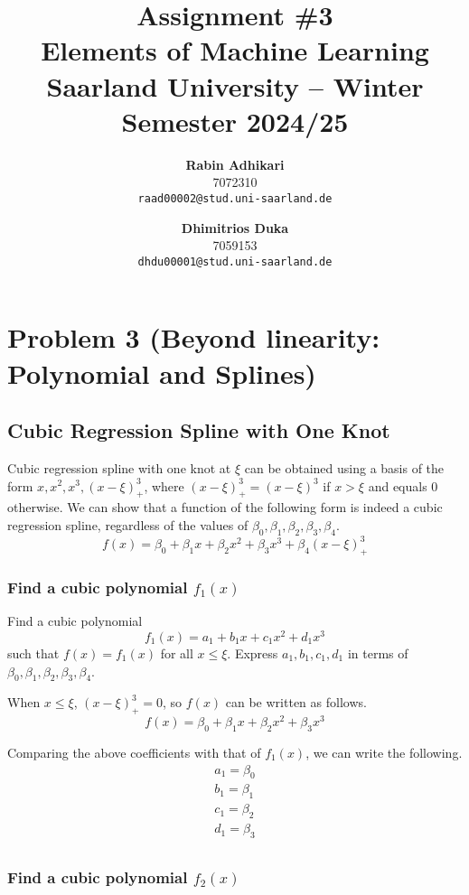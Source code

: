 \documentclass{article}
\title{Assignment \#3\\
  \vspace{2mm}
  \small{Elements of Machine Learning}
  \\
  \vspace{2mm}
  \small{Saarland University -- Winter Semester 2024/25}
}
\author{%
\textbf{Rabin Adhikari} \\
  7072310 \\
  \texttt{raad00002@stud.uni-saarland.de} \\
  \and
  \textbf{Dhimitrios Duka} \\
 7059153 \\
  \texttt{dhdu00001@stud.uni-saarland.de} \\
}
\begin{document}
\maketitle


\setcounter{section}{2}
\section{Problem 3 (Beyond linearity: Polynomial and Splines)}

\subsection{Cubic Regression Spline with One Knot}
Cubic regression spline with one knot at $\xi$ can be obtained using a basis of the form $x, x^2, x^3, \left(x - \xi\right)^3_+$, where $\left(x - \xi\right)^3_+ = \left(x - \xi\right)^3$ if $x > \xi$ and equals 0 otherwise.
We can show that a function of the following form is indeed a cubic regression spline, regardless of the values of $\beta_0, \beta_1, \beta_2, \beta_3, \beta_4$.
\[
    f\left(x\right) = \beta_0 + \beta_1 x + \beta_2 x^2 + \beta_3 x^3 + \beta_4 \left(x - \xi\right)^3_+
\]

\subsubsection{Find a cubic polynomial $f_1\left(x\right)$}

\answer
Find a cubic polynomial 
\[
    f_1\left(x\right) = a_1 + b_1 x + c_1 x^2 + d_1 x^3
\]
such that $f\left(x\right) = f_1\left(x\right)$ for all $x \leq \xi$.
Express $a_1, b_1, c_1, d_1$ in terms of $\beta_0, \beta_1, \beta_2, \beta_3, \beta_4$.

\answer
When $x \leq \xi$, $\left(x - \xi\right)^3_+ = 0$, so $f\left(x\right)$ can be written as follows.
\[
    f\left(x\right) = \beta_0 + \beta_1 x + \beta_2 x^2 + \beta_3 x^3
\]

Comparing the above coefficients with that of $f_1\left(x\right)$, we can write the following.
\begin{gather*}
    a_1 = \beta_0 \\
    b_1 = \beta_1 \\
    c_1 = \beta_2 \\
    d_1 = \beta_3 \\
\end{gather*}

\subsubsection{Find a cubic polynomial $f_2\left(x\right)$}
\end{document}
